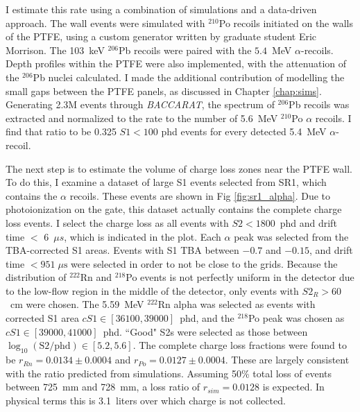 I estimate this rate using  a combination of simulations and a data-driven approach.
The wall events were simulated with $^{210}$Po recoils initiated on the walls of the PTFE, using a custom generator written by graduate student Eric Morrison.
The 103~keV $^{206}$Pb recoils were paired with the $5.4$~MeV $\alpha$-recoils.
Depth profiles within the PTFE were also implemented, with the attenuation of the $^{206}$Pb nuclei calculated.
I made the additional contribution of modelling the small gaps between the PTFE panels, as discussed in Chapter \ref{chap:sims}.
Generating 2.3M events through \textit{BACCARAT}, the spectrum of $^{206}$Pb recoils was extracted and normalized to the rate to the number of 5.6~MeV $^{210}$Po $\alpha$ recoils.
I find that ratio to be 0.325 $S1 <100$ phd events for every detected 5.4~MeV $\alpha$-recoil.

The next step is to estimate the volume of charge loss zones near the PTFE wall.
To do this, I examine a dataset of large S1 events selected from SR1, which contains the $\alpha$ recoils.
These events are shown in Fig \ref{fig:sr1_alpha}.
Due to photoionization on the gate, this dataset actually contains the complete charge loss events.
I select the charge loss as all events with $S2 <1800$~phd and drift time $<$ 6~$\mu s$, which is indicated in the plot.
Each $\alpha$ peak was selected from the TBA-corrected S1 areas.
Events with S1 TBA between $-0.7$ and $-0.15$, and drift time $< 951\;\mu \mathrm{s}$ were selected in order to not be close to the grids.
Because the distribution of $^{222}$Rn and $^{218}$Po events is not perfectly uniform in the detector due to the low-flow region in the middle of the detector, only events with $S2_R>60$~cm were chosen. 
The 5.59~MeV $^{222}$Rn alpha was selected as events with corrected S1 area $cS1\in [36100, 39000]$~phd, and the $^{218}$Po peak was chosen as $cS1 \in [39000, 41000]$~phd.
``Good" S2s were selected as those between $\log_{10}(\mathrm{S2}/\mathrm{phd}) \in [5.2, 5.6]$.
The complete charge loss fractions were found to be $r_{Rn}=0.0134\pm 0.0004$ and $r_{Po}=0.0127\pm0.0004$.
These are largely consistent with the ratio predicted from simulations.
Assuming 50\% total loss of events between 725~mm and 728~mm, a loss ratio of $r_{sim}=0.0128$ is expected.
In physical terms this is 3.1~liters over which charge is not collected.

